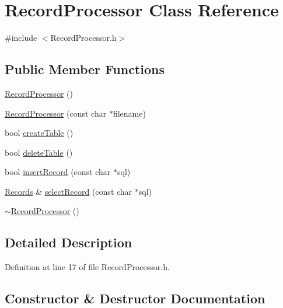 \hypertarget{class_record_processor}{}\section{Record\+Processor Class Reference}
\label{class_record_processor}


{\ttfamily \#include $<$Record\+Processor.\+h$>$}

\subsection*{Public Member Functions}
\begin{DoxyCompactItemize}
\item 
\mbox{\hyperlink{class_record_processor_a3961a0d77a0d83e58a68736311b88a0a}{Record\+Processor}} ()
\item 
\mbox{\hyperlink{class_record_processor_aa64ac5cbddceb678e8cb27e9fc58576c}{Record\+Processor}} (const char $\ast$filename)
\item 
bool \mbox{\hyperlink{class_record_processor_a2c919a73f9cd411c141635f35dd047be}{create\+Table}} ()
\item 
bool \mbox{\hyperlink{class_record_processor_a6739098423e2d913004459282217db2e}{delete\+Table}} ()
\item 
bool \mbox{\hyperlink{class_record_processor_a6101b13cf5883e1fefe3013947ca9b68}{insert\+Record}} (const char $\ast$sql)
\item 
\mbox{\hyperlink{_record_processor_8h_a38f4f71143d55126a9f66fd1f9824999}{Records}} \& \mbox{\hyperlink{class_record_processor_aa246f2377aaba5ade7524813f07eaec0}{select\+Record}} (const char $\ast$sql)
\item 
\mbox{\hyperlink{class_record_processor_a63fbf98c72bafa6c2e24a3962bdae70c}{$\sim$\+Record\+Processor}} ()
\end{DoxyCompactItemize}


\subsection{Detailed Description}


Definition at line 17 of file Record\+Processor.\+h.



\subsection{Constructor \& Destructor Documentation}
\mbox{\label{class_record_processor_a3961a0d77a0d83e58a68736311b88a0a}} 
